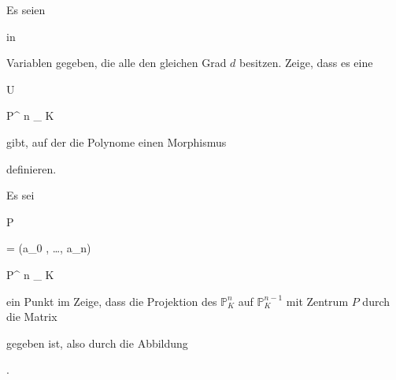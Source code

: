 {} {}





{}

{


Es seien



 in

 Variablen gegeben, die alle den gleichen  Grad $d$ besitzen. Zeige, dass es eine


\mavergleichskette

{\vergleichskette

{ U
}

{ \subseteq }{ {\mathbb P}^{ n }_{ K}
}

{  }{
}

{    }{
}

{   }{
}

}
{}{}{}
gibt, auf der die Polynome einen Morphismus


 {  }


definieren.


}

{} {}



{}

{


Es sei


\mavergleichskette

{\vergleichskette

{ P
}

{ = }{ (a_0 , \ldots , a_n)
}

{ \in }{ {\mathbb P}^{ n }_{ K}
}

{    }{
}

{   }{
}

}
{}{}{}
ein Punkt im
Zeige, dass die Projektion des ${\mathbb P}^{ n }_{ K}$ auf ${\mathbb P}^{n-1}_{K}$ mit Zentrum $P$ durch die Matrix


\mathdisp {} {  }


gegeben ist, also durch die Abbildung


 { . }


}

